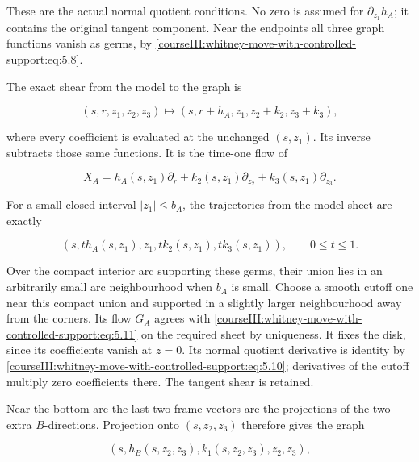 These are the actual normal quotient conditions. No zero is assumed for \(\partial_{z_1}h_A\); it contains the original tangent component. Near the endpoints all three graph functions vanish as germs, by \eqref{courseIII:whitney-move-with-controlled-support:eq:5.8}.

The exact shear from the model to the graph is

\begin{equation}
(s,r,z_1,z_2,z_3)\longmapsto
(s,r+h_A,z_1,z_2+k_2,z_3+k_3),
\label{courseIII:whitney-move-with-controlled-support:eq:5.11}
\end{equation}

where every coefficient is evaluated at the unchanged \((s,z_1)\). Its inverse subtracts those same functions. It is the time-one flow of

\begin{equation}
X_A=h_A(s,z_1)\partial_r+
k_2(s,z_1)\partial_{z_2}+k_3(s,z_1)\partial_{z_3}.
\label{courseIII:whitney-move-with-controlled-support:eq:5.12}
\end{equation}

For a small closed interval \(|z_1|\leq b_A\), the trajectories from the model sheet are exactly

\begin{equation}
(s,t h_A(s,z_1),z_1,t k_2(s,z_1),t k_3(s,z_1)),
\qquad 0\leq t\leq1.
\label{courseIII:whitney-move-with-controlled-support:eq:5.13}
\end{equation}

Over the compact interior arc supporting these germs, their union lies in an arbitrarily small arc neighbourhood when \(b_A\) is small. Choose a smooth cutoff one near this compact union and supported in a slightly larger neighbourhood away from the corners. Its flow \(G_A\) agrees with \eqref{courseIII:whitney-move-with-controlled-support:eq:5.11} on the required sheet by uniqueness. It fixes the disk, since its coefficients vanish at \(z=0\). Its normal quotient derivative is identity by \eqref{courseIII:whitney-move-with-controlled-support:eq:5.10}; derivatives of the cutoff multiply zero coefficients there. The tangent shear is retained.

Near the bottom arc the last two frame vectors are the projections of the two extra \(B\)-directions. Projection onto \((s,z_2,z_3)\) therefore gives the graph

\begin{equation}
(s,h_B(s,z_2,z_3),k_1(s,z_2,z_3),z_2,z_3),
\label{courseIII:whitney-move-with-controlled-support:eq:5.14}
\end{equation}

